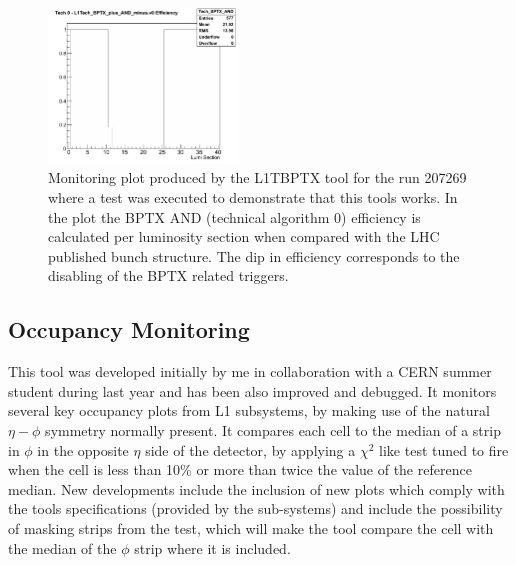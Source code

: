 \begin{figure}[!htb]
\centering
\includegraphics[width=0.45\textwidth]{Chapter03/L1TOnline/Images/L1TBPTX_Tech_BPTX_AND.png}
\caption{Monitoring plot produced by the L1TBPTX tool for the run 207269 where a test was executed to demonstrate that 
this tools works. In the plot the BPTX AND (technical algorithm 0) efficiency is calculated per luminosity section 
when compared with the LHC published bunch structure. The dip in efficiency corresponds to the disabling of the BPTX 
related triggers.} 
\label{figure_ServiceWork_L1TBPTX}
\end{figure}

\subsection{Occupancy Monitoring}

This tool was developed initially by me in collaboration with a CERN summer student during last year and has been
also improved and debugged. It monitors several key occupancy plots from L1 subsystems, by making use of the natural
$\eta-\phi$ symmetry normally present. It compares each cell to the median of a strip in $\phi$ in the opposite $\eta$
side of the detector, by applying a $\chi^{2}$ like test tuned to fire when the cell is less than 10\% or more than
twice the value of the reference median. New developments include the inclusion of new plots which comply with the
tools specifications (provided by the sub-systems) and include the possibility of masking strips from the test, which 
will make the tool compare the cell with the median of the $\phi$ strip where it is included.

